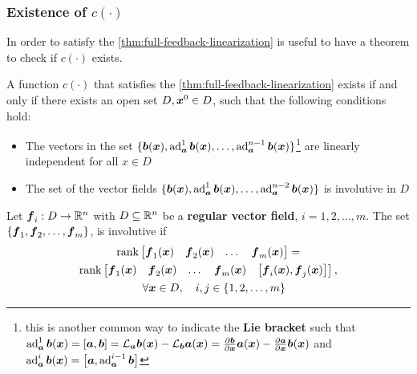 \subsubsection{Existence of $c(\cdot)$}

In order to satisfy the \cref{thm:full-feedback-linearization} is useful to have a theorem to check if $c(\cdot)$ exists.

\begin{theorem}
    A function $c(\cdot)$ that satisfies the \cref{thm:full-feedback-linearization} exists if and only if there exists an open set $D, \boldsymbol{x}^0 \in D$, such that the following conditions hold:

    \begin{itemize}
        \item The vectors in the set $\{\boldsymbol{b}(\boldsymbol{x}), \operatorname{ad}_{\boldsymbol{a}}^1 \boldsymbol{b}(\boldsymbol{x}), \dots, \operatorname{ad}_{\boldsymbol{a}}^{n-1} \boldsymbol{b}(\boldsymbol{x}) \}$\footnote{this is another common way to indicate the \textbf{Lie bracket} such that $\operatorname{ad}_{\boldsymbol{a}}^{1}\boldsymbol{b}(\boldsymbol{x}) = \left[ \boldsymbol{a}, \boldsymbol{b} \right] = \mathcal{L}_{\boldsymbol{a}}\boldsymbol{b}(\boldsymbol{x}) - \mathcal{L}_{\boldsymbol{b}}\boldsymbol{a}(\boldsymbol{x}) = \frac{\partial \boldsymbol{b}}{\partial \boldsymbol{x}}\boldsymbol{a}(\boldsymbol{x}) - \frac{\partial \boldsymbol{a}}{\partial \boldsymbol{x}}\boldsymbol{b}(\boldsymbol{x})$ and $\operatorname{ad}_{\boldsymbol{a}}^{i}\boldsymbol{b}(\boldsymbol{x}) = \left[ \boldsymbol{a}, \operatorname{ad}_{\boldsymbol{a}}^{i-1}\boldsymbol{b} \right]$} are linearly independent for all $x \in D$
        \item The set of the vector fields $\{\boldsymbol{b}(\boldsymbol{x}), \operatorname{ad}_{\boldsymbol{a}}^1 \boldsymbol{b}(\boldsymbol{x}), \dots, \operatorname{ad}_{\boldsymbol{a}}^{n-2} \boldsymbol{b}(\boldsymbol{x}) \}$ is involutive in $D$
    \end{itemize}
\end{theorem}

\begin{definition}[Involutive]
Let $\boldsymbol{f}_i : D \to \mathbb{R}^n$ with $D \subseteq \mathbb{R}^n$ be a \textbf{regular vector field}, $i= 1,2,\dots, m$.
    The set $\{\boldsymbol{f}_1, \boldsymbol{f}_2, \dots, \boldsymbol{f}_m\}$, is involutive if
    \begin{multline*}
        \operatorname{rank} \begin{bmatrix} \boldsymbol{f}_1(\boldsymbol{x}) & \boldsymbol{f}_2(\boldsymbol{x}) & \dots & \boldsymbol{f}_m(\boldsymbol{x}) \end{bmatrix} = \\
        \operatorname{rank} \begin{bmatrix} \boldsymbol{f}_1(\boldsymbol{x}) & \boldsymbol{f}_2(\boldsymbol{x}) & \dots & \boldsymbol{f}_m(\boldsymbol{x}) & \left[ \boldsymbol{f}_i(\boldsymbol{x}), \boldsymbol{f}_j(\boldsymbol{x}) \right] \end{bmatrix}, \\
        \quad \forall \boldsymbol{x} \in D, \quad i,j \in \{1,2,\dots, m\}
    \end{multline*}
\end{definition}

